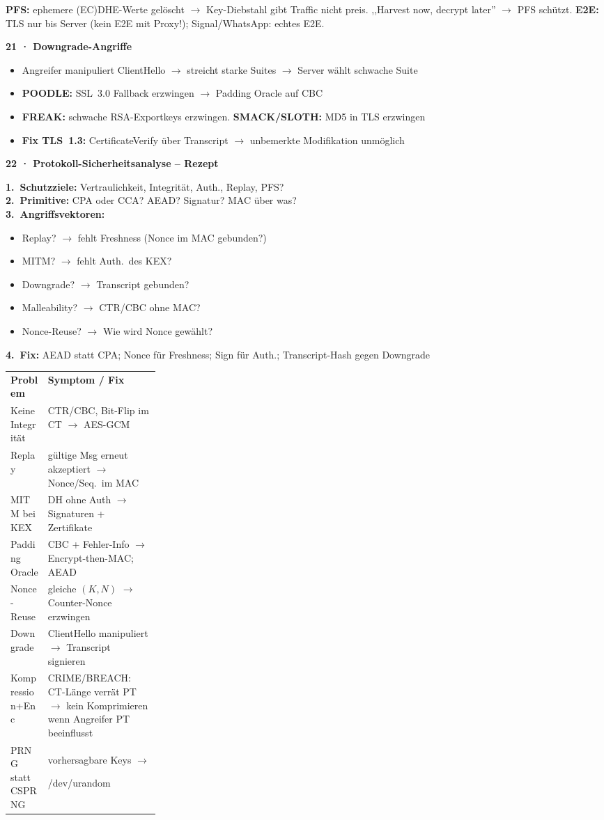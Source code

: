 \documentclass[11pt,a4paper]{article}
\newcommand{\tabstart}{%
  \rowcolors{2}{rowgray}{white}%
}
\newcommand{\tabend}{\rowcolors{1}{}{}}
\newcommand{\h}[1]{%
  \vspace{3pt}%
  \noindent\colorbox{hdr2}{%
    \parbox{\dimexpr\linewidth-2\fboxsep}{\color{white}\bfseries #1}}%
  \par\vspace{1pt}%
}
\newenvironment{ibox}{\begin{mdframed}[style=infoS]}{\end{mdframed}}
\newcommand{\cd}[1]{{\small\ttfamily\colorbox{codebg}{\strut #1}}}
\newcommand{\THH}[1]{\cellcolor{hdrtbl}\color{white}\textbf{#1}}
\begin{document}
\begin{multicols}{2}
\textbf{PFS:} ephemere (EC)DHE-Werte gelöscht $\to$ Key-Diebstahl
gibt Traffic nicht preis. ,,Harvest now, decrypt later'' $\to$ PFS schützt.
\textbf{E2E:} TLS nur bis Server (kein E2E mit Proxy!);
Signal/WhatsApp: echtes E2E.

\h{21 · Downgrade-Angriffe}
\begin{itemize}
\item Angreifer manipuliert ClientHello $\to$ streicht starke Suites
  $\to$ Server wählt schwache Suite
\item \textbf{POODLE:} SSL~3.0 Fallback erzwingen $\to$
  Padding Oracle auf CBC
\item \textbf{FREAK:} schwache RSA-Exportkeys erzwingen.
  \textbf{SMACK/SLOTH:} MD5 in TLS erzwingen
\item \textbf{Fix TLS~1.3:} CertificateVerify über Transcript
  $\to$ unbemerkte Modifikation unmöglich
\end{itemize}

\h{22 · Protokoll-Sicherheitsanalyse -- Rezept}
\begin{ibox}
\textbf{1.\ Schutzziele:} Vertraulichkeit, Integrität, Auth., Replay, PFS?\\
\textbf{2.\ Primitive:} CPA oder CCA? AEAD? Signatur? MAC über was?\\
\textbf{3.\ Angriffsvektoren:}
\begin{itemize}[topsep=0pt,itemsep=0pt,parsep=0pt]
\item Replay? $\to$ fehlt Freshness (Nonce im MAC gebunden?)
\item MITM? $\to$ fehlt Auth.\ des KEX?
\item Downgrade? $\to$ Transcript gebunden?
\item Malleability? $\to$ CTR/CBC ohne MAC?
\item Nonce-Reuse? $\to$ Wie wird Nonce gewählt?
\end{itemize}
\textbf{4.\ Fix:} AEAD statt CPA; Nonce für Freshness;
Sign für Auth.; Transcript-Hash gegen Downgrade
\end{ibox}

\tabstart
\begin{tabularx}{\linewidth}{K{0.25\linewidth}L}
\THH{Problem} & \THH{Symptom / Fix}\\
Keine Integrität  & CTR/CBC, Bit-Flip im CT $\to$ AES-GCM\\
Replay            & gültige Msg erneut akzeptiert $\to$ Nonce/Seq.\ im MAC\\
MITM bei KEX      & DH ohne Auth $\to$ Signaturen + Zertifikate\\
Padding Oracle    & CBC + Fehler-Info $\to$ Encrypt-then-MAC; AEAD\\
Nonce-Reuse       & gleiche $(K,N)$ $\to$ Counter-Nonce erzwingen\\
Downgrade         & ClientHello manipuliert $\to$ Transcript signieren\\
Kompression+Enc   & CRIME/BREACH: CT-Länge verrät PT $\to$
  kein Komprimieren wenn Angreifer PT beeinflusst\\
PRNG statt CSPRNG & vorhersagbare Keys $\to$ \cd{/dev/urandom}\\
\end{tabularx}
\tabend


\end{multicols}
\end{document}

